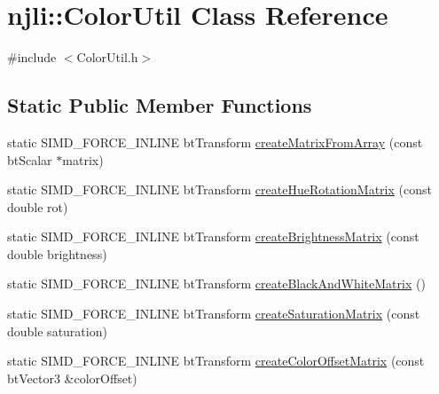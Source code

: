 \hypertarget{classnjli_1_1_color_util}{}\section{njli\+:\+:Color\+Util Class Reference}
\label{classnjli_1_1_color_util}


{\ttfamily \#include $<$Color\+Util.\+h$>$}

\subsection*{Static Public Member Functions}
\begin{DoxyCompactItemize}
\item 
static S\+I\+M\+D\+\_\+\+F\+O\+R\+C\+E\+\_\+\+I\+N\+L\+I\+NE bt\+Transform \mbox{\hyperlink{classnjli_1_1_color_util_a85a15dfc97aa9126dc33b0b745b745c2}{create\+Matrix\+From\+Array}} (const bt\+Scalar $\ast$matrix)
\item 
static S\+I\+M\+D\+\_\+\+F\+O\+R\+C\+E\+\_\+\+I\+N\+L\+I\+NE bt\+Transform \mbox{\hyperlink{classnjli_1_1_color_util_a7df3c9ab1162ce070ff7ad84b8b34306}{create\+Hue\+Rotation\+Matrix}} (const double rot)
\item 
static S\+I\+M\+D\+\_\+\+F\+O\+R\+C\+E\+\_\+\+I\+N\+L\+I\+NE bt\+Transform \mbox{\hyperlink{classnjli_1_1_color_util_a7e24d543b65d6e9cd535fb99e87fe31e}{create\+Brightness\+Matrix}} (const double brightness)
\item 
static S\+I\+M\+D\+\_\+\+F\+O\+R\+C\+E\+\_\+\+I\+N\+L\+I\+NE bt\+Transform \mbox{\hyperlink{classnjli_1_1_color_util_a0114e6d4fd8f02fb82ac5947030ab87d}{create\+Black\+And\+White\+Matrix}} ()
\item 
static S\+I\+M\+D\+\_\+\+F\+O\+R\+C\+E\+\_\+\+I\+N\+L\+I\+NE bt\+Transform \mbox{\hyperlink{classnjli_1_1_color_util_a3612463fc463d7fb5edad289bf02edb8}{create\+Saturation\+Matrix}} (const double saturation)
\item 
static S\+I\+M\+D\+\_\+\+F\+O\+R\+C\+E\+\_\+\+I\+N\+L\+I\+NE bt\+Transform \mbox{\hyperlink{classnjli_1_1_color_util_a2c4280f030420f1cf84d97dc4c2eba98}{create\+Color\+Offset\+Matrix}} (const bt\+Vector3 \&color\+Offset)
\end{DoxyCompactItemize}
